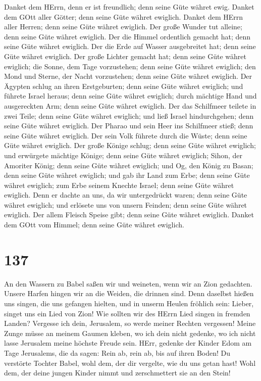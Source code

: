  Danket dem HErrn, denn er ist freundlich; denn seine Güte
währet ewig.  Danket dem GOtt aller Götter; denn seine Güte
währet ewiglich.  Danket dem HErrn aller Herren; denn seine
Güte währet ewiglich.  Der große Wunder tut alleine; denn
seine Güte währet ewiglich.  Der die Himmel ordentlich
gemacht hat; denn seine Güte währet ewiglich.  Der die Erde
auf Wasser ausgebreitet hat; denn seine Güte währet ewiglich.
 Der große Lichter gemacht hat; denn seine Güte währet
ewiglich;  die Sonne, dem Tage vorzustehen; denn seine Güte
währet ewiglich;  den Mond und Sterne, der Nacht
vorzustehen; denn seine Güte währet ewiglich.  Der Ägypten
schlug an ihren Erstgeburten; denn seine Güte währet ewiglich;
 und führete Israel heraus; denn seine Güte währet
ewiglich;  durch mächtige Hand und ausgereckten Arm; denn
seine Güte währet ewiglich.  Der das Schilfmeer teilete in
zwei Teile; denn seine Güte währet ewiglich;  und ließ
Israel hindurchgehen; denn seine Güte währet ewiglich.  Der
Pharao und sein Heer ins Schilfmeer stieß; denn seine Güte währet
ewiglich.  Der sein Volk führete durch die Wüste; denn
seine Güte währet ewiglich.  Der große Könige schlug; denn
seine Güte währet ewiglich;  und erwürgete mächtige Könige;
denn seine Güte währet ewiglich;  Sihon, der Amoriter
König; denn seine Güte währet ewiglich;  und Og, den König
zu Basan; denn seine Güte währet ewiglich;  und gab ihr
Land zum Erbe; denn seine Güte währet ewiglich;  zum Erbe
seinem Knechte Israel; denn seine Güte währet ewiglich. 
Denn er dachte an uns, da wir untergedrückt waren; denn seine Güte
währet ewiglich;  und erlösete uns von unsern Feinden; denn
seine Güte währet ewiglich.  Der allem Fleisch Speise gibt;
denn seine Güte währet ewiglich.  Danket dem GOtt vom
Himmel; denn seine Güte währet ewiglich.

\hypertarget{section-136}{%
\section{137}\label{section-136}}

 An den Wassern zu Babel saßen wir und weineten, wenn wir an
Zion gedachten.  Unsere Harfen hingen wir an die Weiden, die
drinnen sind.  Denn daselbst hießen uns singen, die uns
gefangen hielten, und in unserm Heulen fröhlich sein: Lieber, singet uns
ein Lied von Zion!  Wie sollten wir des HErrn Lied singen in
fremden Landen?  Vergesse ich dein, Jerusalem, so werde
meiner Rechten vergessen!  Meine Zunge müsse an meinem
Gaumen kleben, wo ich dein nicht gedenke, wo ich nicht lasse Jerusalem
meine höchste Freude sein.  HErr, gedenke der Kinder Edom am
Tage Jerusalems, die da sagen: Rein ab, rein ab, bis auf ihren Boden!
 Du verstörte Tochter Babel, wohl dem, der dir vergelte, wie
du uns getan hast!  Wohl dem, der deine jungen Kinder nimmt
und zerschmettert sie an den Stein!

